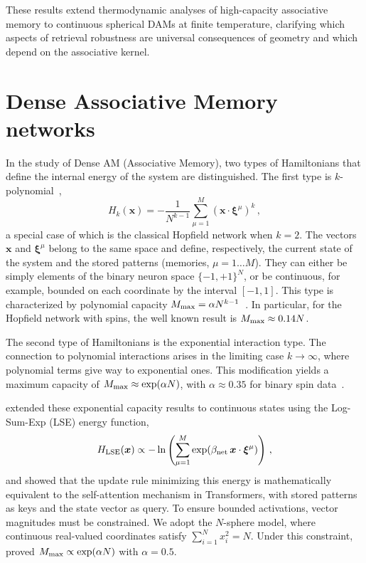 \documentclass{article}
\theoremstyle{plain}
\theoremstyle{definition}
\theoremstyle{remark}
\begin{document}
These results extend thermodynamic analyses of high-capacity associative memory to continuous spherical DAMs at finite temperature, clarifying which aspects of retrieval robustness are universal consequences of geometry and which depend on the associative kernel.






\section{Dense Associative Memory networks}

In the study of Dense AM (Associative Memory), two types of Hamiltonians that define the internal energy of the system are distinguished. The first type is $k$-polynomial~\cite{krotov2016dense}, 
\begin{equation}
    H_k(\bm{x}) = - \frac{1}{N^{k-1}} \sum\limits_{\mu=1}^{M} (\bm{x} \cdot \bm{\xi}^\mu)^k\,,
    \label{eq:H_k}
\end{equation}
a special case of which is the classical Hopfield network \cite{Hopfield1982} when $k=2$. 
The vectors $\bm{x}$ and $\bm{\xi}^\mu$ belong to the same space and define, respectively, the current state of the system and the stored patterns (memories, $\mu=1\dots M$). They can either be simply elements of the binary neuron space $\{-1,+1\}^N$, or be continuous, for example, bounded on each coordinate by the interval $[-1, 1]$. This type is characterized by polynomial capacity $M_{\rm max} = \alpha N^{k-1}$~\cite{krotov2016dense}. In particular, for the Hopfield network with spins, the well known result is $M_{\rm max} \approx 0.14N$.

The second type of Hamiltonians is the exponential interaction type. The connection to polynomial interactions arises in the limiting case $k \to \infty$, where polynomial terms give way to exponential ones. This modification yields a maximum capacity of $M_{\rm max} \approx \exp(\alpha N)$, with $\alpha \approx 0.35$ for binary spin data~\cite{demircigil2017model}.

\citet{ramsauer2021hopfield} extended these exponential capacity results to continuous states using the Log-Sum-Exp (LSE) energy function,
\begin{equation}
    H_{\rm LSE}(\bm{x}) \propto -\ln \left( \sum_{\mu=1}^M \exp(\beta_{\rm net} \, \bm{x} \cdot \bm{\xi}^\mu) \right) \,,
    \label{eq:lse_energy}
\end{equation}
and showed that the update rule minimizing this energy is mathematically equivalent to the self-attention mechanism in Transformers, with stored patterns as keys and the state vector as query. To ensure bounded activations, vector magnitudes must be constrained. We adopt the $N$-sphere model, where continuous real-valued coordinates satisfy $\sum_{i=1}^{N} x_i^2 = N$. Under this constraint, \citet{ramsauer2021hopfield} proved $M_{\rm max} \propto \exp(\alpha N)$ with $\alpha = 0.5$.
\end{document}
